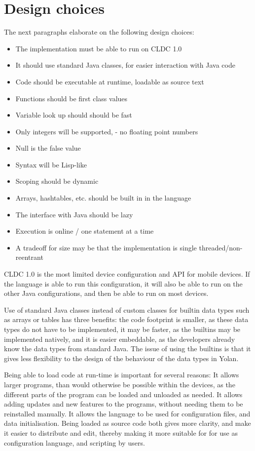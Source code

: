 \documentclass[11pt]{report}
\begin{document}
\section{Design choices}
The next paragraphs elaborate on the following design choices:
\begin{itemize}
\item The implementation must be able to run on CLDC 1.0
\item It should use standard Java classes, for easier interaction with Java code
\item Code should be executable at runtime, loadable as source text
\item Functions should be first class values
\item Variable look up should should be fast
\item Only integers will be supported, - no floating point numbers
\item Null is the false value
\item Syntax will be Lisp-like
\item Scoping should be dynamic
\item Arrays, hashtables, etc. should be built in in the language
\item The interface with Java should be lazy
\item Execution is online / one statement at a time
\item A tradeoff for size may be that the implementation is single threaded/non-reentrant 
\end{itemize}

CLDC 1.0 is the most limited device configuration and API for mobile devices. If the language is able to run this configuration, it will also be able to run on the other Java configurations, and then be able to run on most devices.

\label{yolandesign}
Use of standard Java classes instead of custom classes for builtin data types such as arrays or tables has three benefits: the code footprint is smaller, as these data types do not have to be implemented, it may be faster, as the builtins may be implemented natively, and it is easier embeddable, as the developers already know the data types from standard Java.
The issue of using the builtins is that it gives less flexibility to the design of the behaviour of the data types in Yolan.

Being able to load code at run-time is important for several reasons:
It allows larger programs, than would otherwise be possible within the devices, as the different parts of the program can be loaded and unloaded as needed.
It allows adding updates and new features to the programs, without needing them to be reinstalled manually.
It allows the language to be used for configuration files, and data initialisation.
Being loaded as source code both gives more clarity, and make it easier to distribute and edit, thereby making it more suitable for for use as configuration language, and scripting by users.
\end{document}
